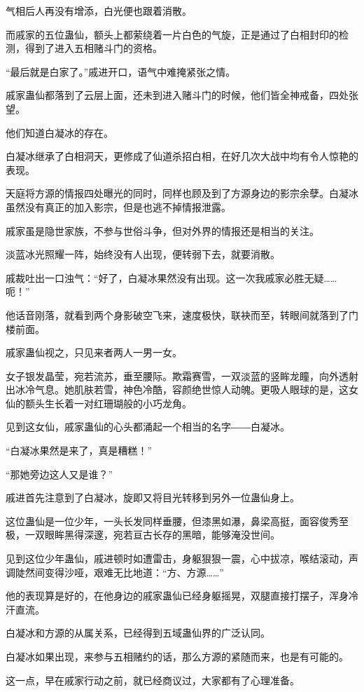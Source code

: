 \begin{this_body}
气相后人再没有增添，白光便也跟着消散。

而戚家的五位蛊仙，额头上都萦绕着一片白色的气旋，正是通过了白相封印的检测，得到了进入五相赌斗门的资格。

“最后就是白家了。”戚进开口，语气中难掩紧张之情。

戚家蛊仙都落到了云层上面，还未到进入赌斗门的时候，他们皆全神戒备，四处张望。

他们知道白凝冰的存在。

白凝冰继承了白相洞天，更修成了仙道杀招白相，在好几次大战中均有令人惊艳的表现。

天庭将方源的情报四处曝光的同时，同样也顾及到了方源身边的影宗余孽。白凝冰虽然没有真正的加入影宗，但是也逃不掉情报泄露。

戚家虽是隐世家族，不参与世俗斗争，但对外界的情报还是相当的关注。

淡蓝冰光照耀一阵，始终没有人出现，便转弱下去，就要消散。

戚裁吐出一口浊气：“好了，白凝冰果然没有出现。这一次我戚家必胜无疑……呃！”

他话音刚落，就看到两个身影破空飞来，速度极快，联袂而至，转眼间就落到了门楼前面。

戚家蛊仙视之，只见来者两人一男一女。

女子银发晶莹，宛若流苏，垂至腰际。欺霜赛雪，一双淡蓝的竖眸龙瞳，向外透射出冰冷气息。她肌肤若雪，神色冷酷，容颜绝世惊人动魄。更吸人眼球的是，这女仙的额头生长着一对红珊瑚般的小巧龙角。

见到这女仙，戚家蛊仙的心头都涌起一个相当的名字――白凝冰。

“白凝冰果然是来了，真是糟糕！”

“那她旁边这人又是谁？”

戚进首先注意到了白凝冰，旋即又将目光转移到另外一位蛊仙身上。

这位蛊仙是一位少年，一头长发同样垂腰，但漆黑如瀑，鼻梁高挺，面容俊秀至极，一双眼眸黑得深邃，宛若亘古长存的黑暗，能够淹没世间。

见到这位少年蛊仙，戚进顿时如遭雷击，身躯狠狠一震，心中拔凉，喉结滚动，声调陡然间变得沙哑，艰难无比地道：“方、方源……”

他的表现算是好的，在他身边的戚家蛊仙已经身躯摇晃，双腿直接打摆子，浑身冷汗直流。

白凝冰和方源的从属关系，已经得到五域蛊仙界的广泛认同。

白凝冰如果出现，来参与五相赌约的话，那么方源的紧随而来，也是有可能的。

这一点，早在戚家行动之前，就已经商议过，大家都有了心理准备。


\end{this_body}
